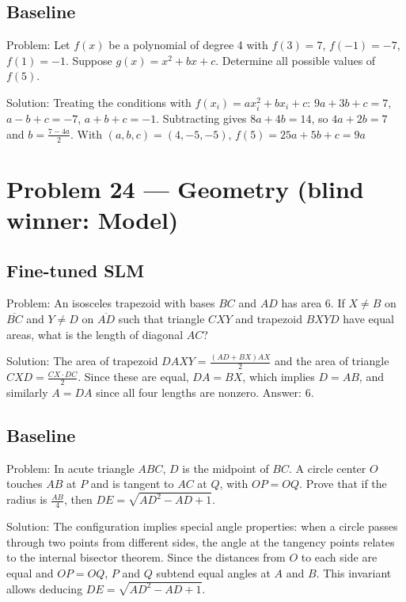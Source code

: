 \documentclass[11pt]{article}
\begin{document}
\subsection*{Baseline}

Problem:
Let $f(x)$ be a polynomial of degree 4 with $f(3) = 7$, $f(-1) = -7$, $f(1) = -1$. Suppose $g(x) = x^2 + bx + c$. Determine all possible values of $f(5)$.

Solution:
Treating the conditions with $f(x_i)=ax_i^2+bx_i+c$: $9a+3b+c=7$, $a-b+c=-7$, $a+b+c=-1$. Subtracting gives $8a+4b=14$, so $4a+2b=7$ and $b=\frac{7-4a}2$. With $(a,b,c)=(4,-5,-5)$, $f(5)=25a+5b+c=9a$

\section*{Problem 24 --- Geometry \quad(blind winner: Model)}

\subsection*{Fine-tuned SLM}

Problem:
An isosceles trapezoid with bases $BC$ and $AD$ has area 6. If $X \neq B$ on $\overline{BC}$ and $Y \neq D$ on $\overline{AD}$ such that triangle $CXY$ and trapezoid $BXYD$ have equal areas, what is the length of diagonal $AC$?

Solution:
The area of trapezoid $DAXY = \frac{(AD+BX)AX}2$ and the area of triangle $CXD = \frac{CX\cdot DC}2$. Since these are equal, $DA=BX$, which implies $D=AB$, and similarly $A=DA$ since all four lengths are nonzero. Answer: 6.

\subsection*{Baseline}

Problem:
In acute triangle $ABC$, $D$ is the midpoint of $BC$. A circle center $O$ touches $AB$ at $P$ and is tangent to $AC$ at $Q$, with $OP = OQ$. Prove that if the radius is $\frac{AB}{4}$, then $DE = \sqrt{AD^2 - AD + 1}$.

Solution:
The configuration implies special angle properties: when a circle passes through two points from different sides, the angle at the tangency points relates to the internal bisector theorem. Since the distances from $O$ to each side are equal and $OP=OQ$, $P$ and $Q$ subtend equal angles at $A$ and $B$. This invariant allows deducing $DE = \sqrt{AD^2 - AD + 1}$.
\end{document}
